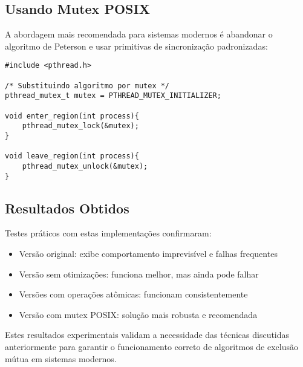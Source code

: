 \documentclass[12pt]{article}
\begin{document}
\subsection{Usando Mutex POSIX}

A abordagem mais recomendada para sistemas modernos é abandonar o algoritmo de Peterson e usar primitivas de sincronização padronizadas:

\begin{lstlisting}
#include <pthread.h>

/* Substituindo algoritmo por mutex */
pthread_mutex_t mutex = PTHREAD_MUTEX_INITIALIZER;

void enter_region(int process){
    pthread_mutex_lock(&mutex);
}

void leave_region(int process){
    pthread_mutex_unlock(&mutex);
}
\end{lstlisting}

\subsection{Resultados Obtidos}

Testes práticos com estas implementações confirmaram:

\begin{itemize}
    \item Versão original: exibe comportamento imprevisível e falhas frequentes
    \item Versão sem otimizações: funciona melhor, mas ainda pode falhar
    \item Versões com operações atômicas: funcionam consistentemente
    \item Versão com mutex POSIX: solução mais robusta e recomendada
\end{itemize}

Estes resultados experimentais validam a necessidade das técnicas discutidas anteriormente para garantir o funcionamento correto de algoritmos de exclusão mútua em sistemas modernos.
\end{document}
